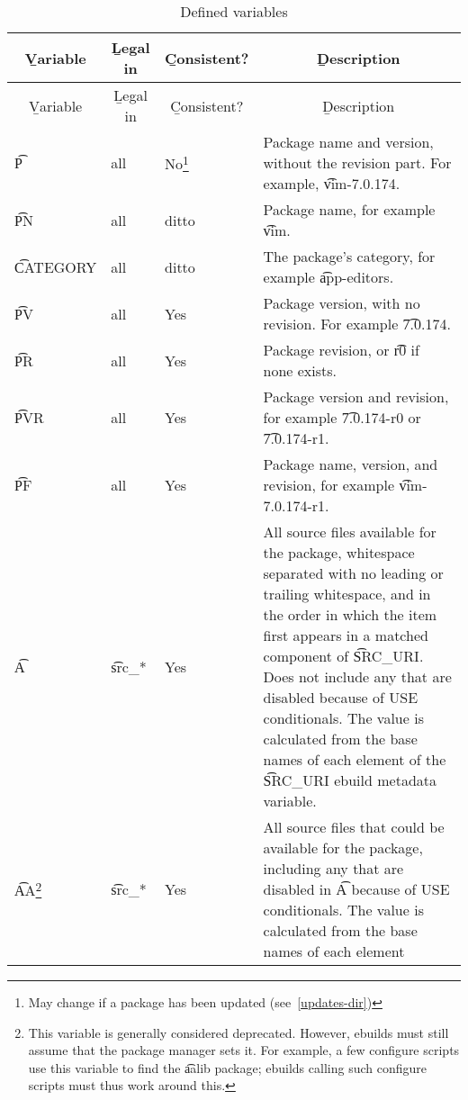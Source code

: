 \begin{longtable}{l p{} l p{}}
\caption{Defined variables}\\
\toprule
\multicolumn{1}{c}{\b{Variable}} &
\multicolumn{1}{c}{\b{Legal in}} &
\multicolumn{1}{c}{\b{Consistent?}} &
\multicolumn{1}{c}{\b{Description}} \\
\midrule
\endfirsthead
\midrule
\multicolumn{1}{c}{\b{Variable}} &
\multicolumn{1}{c}{\b{Legal in}} &
\multicolumn{1}{c}{\b{Consistent?}} &
\multicolumn{1}{c}{\b{Description}} \\
\midrule
\endhead
\midrule
\endfoot
\bottomrule
\endlastfoot
\t{P} &
    all &
    No\footnote{May change if a package has been updated (see~\ref{updates-dir})} &
    Package name and version, without the revision part. For example, \t{vim-7.0.174}. \\
\t{PN} &
    all &
    ditto &
    Package name, for example \t{vim}. \\
\t{CATEGORY} &
    all &
    ditto &
    The package's category, for example \t{app-editors}. \\
\t{PV} &
    all &
    Yes &
    Package version, with no revision. For example \t{7.0.174}. \\
\t{PR} &
    all &
    Yes &
    Package revision, or \t{r0} if none exists. \\
\t{PVR} &
    all &
    Yes &
    Package version and revision, for example \t{7.0.174-r0} or \t{7.0.174-r1}. \\
\t{PF} &
    all &
    Yes &
    Package name, version, and revision, for example \t{vim-7.0.174-r1}. \\
\t{A} &
    \t{src\_*} &
    Yes &
    All source files available for the package, whitespace separated with no leading or trailing
    whitespace, and in the order in which the item first appears in a matched component of
    \t{SRC\_URI}\@. Does not include any that are disabled because of USE conditionals. The value is
    calculated from the base names of each element of the \t{SRC\_URI} ebuild metadata variable. \\
\t{AA}\footnote{This variable is generally considered deprecated. However, ebuilds must still
    assume that the package manager sets it. For example, a few configure scripts use this variable
    to find the \t{aalib} package; ebuilds calling such configure scripts must thus work around
    this.} &
    \t{src\_*} &
    Yes &
    All source files that could be available for the package, including any that are disabled in
    \t{A} because of USE conditionals. The value is calculated from the base names of each element

\end{longtable}

